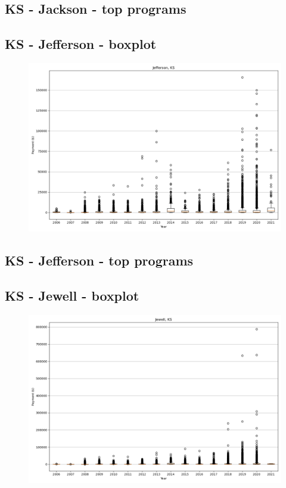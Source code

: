\subsection*{KS - Jackson - top programs}

\newpage
\subsection*{KS - Jefferson - boxplot}
\begin{figure}[h]
\centering
\includegraphics[width=7in]{../output/boxplots/counties/Jefferson-KS_boxplot.png}
\end{figure}


\subsection*{KS - Jefferson - top programs}

\newpage
\subsection*{KS - Jewell - boxplot}
\begin{figure}[h]
\centering
\includegraphics[width=7in]{../output/boxplots/counties/Jewell-KS_boxplot.png}
\end{figure}



